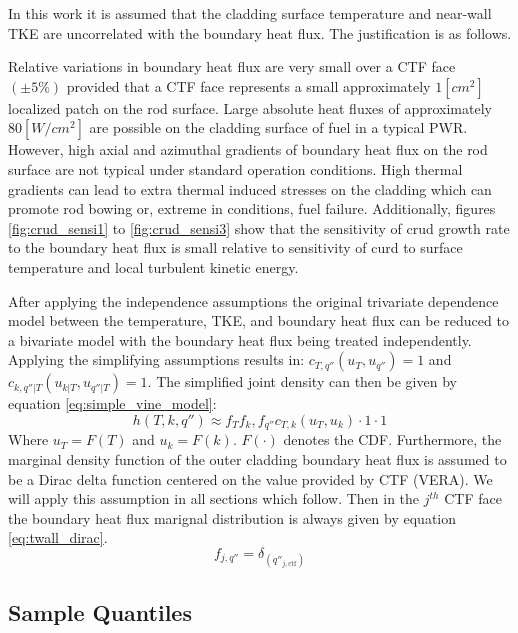 In this work it is assumed that the cladding surface temperature and near-wall TKE are uncorrelated with the boundary heat flux.  The justification is as follows.

Relative variations in boundary heat flux are very small over a CTF face $(\pm 5\%)$ provided that a CTF face represents a small approximately $1 [cm^2]$ localized patch on the rod surface.  Large absolute heat fluxes of approximately $80 [W/cm^2]$ are possible on the cladding surface of fuel in a typical PWR.  However, high axial and azimuthal gradients of boundary heat flux on the rod surface are not typical under standard operation conditions.  High thermal gradients can lead to extra thermal induced stresses on the cladding which can promote rod bowing or, extreme in conditions, fuel failure.
Additionally, figures \ref{fig:crud_sensi1} to \ref{fig:crud_sensi3} show that the sensitivity of crud growth rate to the boundary heat flux is small relative to sensitivity of curd to surface temperature and local turbulent kinetic energy.


After applying the independence assumptions the original trivariate dependence model between the temperature, TKE, and boundary heat flux can be reduced to a bivariate model with the boundary heat flux being treated independently.  Applying the simplifying assumptions results in: $c_{T,q''}(u_T, u_{q''}) = 1$ and $c_{k,q''|T}(u_{k|T}, u_{q''|T}) = 1$. The simplified joint density can then be given by equation \ref{eq:simple_vine_model}:
\begin{equation}
h(T, k, q'') \approx  f_T f_k, f_{q''} c_{T,k}(u_{T}, u_{k})  \cdot 1 \cdot 1
\label{eq:simple_vine_model}
\end{equation}
Where $u_T=F(T)$ and $u_k = F(k)$. $F(\cdot)$ denotes the CDF.
Furthermore, the marginal density function of the outer cladding boundary heat flux is assumed to be a Dirac delta function centered on the value provided by CTF (VERA).  We will apply this assumption in all sections which follow.
Then in the $j^{th}$ CTF face the boundary heat flux marignal distribution is always given by equation \ref{eq:twall_dirac}.
\begin{equation}
f_{j,q''} = \delta_{(q''_{j, \mathrm{ctf}})}
\label{eq:twall_dirac}
\end{equation}





\subsection{Sample Quantiles}

